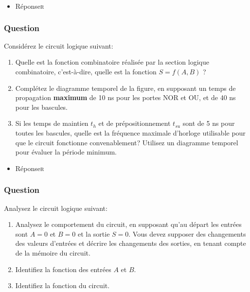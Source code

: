 \documentclass[11pt]{article}
\begin{document}
\begin{itemize}
\item Réponse\hfill{}\textsc{r}
\label{sec:orge8fa134}
\end{itemize}

\subsubsection*{Question}
\label{sec:orgaf65e85}
 Considérez le circuit logique suivant:
\begin{center}

\end{center}

\begin{enumerate}
\item Quelle est la fonction combinatoire réalisée par la section
logique combinatoire, c'est-à-dire, quelle est la fonction \(S =
         f(A,B)\) ?

\item Complétez le diagramme temporel de la figure, en supposant un
temps de propagation \textbf{maximum} de 10 ns pour les portes NOR et OU,
et de 40 ns pour les bascules.

\item Si les temps de maintien \(t_{h}\) et de prépositionnement \(t_{su}\)
sont de 5 ns pour toutes les bascules, quelle est la fréquence
maximale d'horloge utilisable pour que le circuit fonctionne
convenablement? Utilisez un diagramme temporel pour évaluer la
période minimum.
\end{enumerate}

\begin{itemize}
\item Réponse\hfill{}\textsc{r}
\label{sec:orgaf8be12}
\end{itemize}

\subsubsection*{Question}
\label{sec:org5330fb2}
 Analysez le circuit logique suivant:
\begin{center}

\end{center}

\begin{enumerate}
\item Analysez le comportement du circuit, en supposant qu'au départ les
entrées sont \(A=0\) et \(B=0\) et la sortie \(S=0\). Vous devez
supposer des changements des valeurs d'entrées et décrire les
changements des sorties, en tenant compte de la mémoire du
circuit.

\item Identifiez la fonction des entrées \(A\) et \(B\).

\item Identifiez la fonction du circuit.
\end{enumerate}
\end{document}
